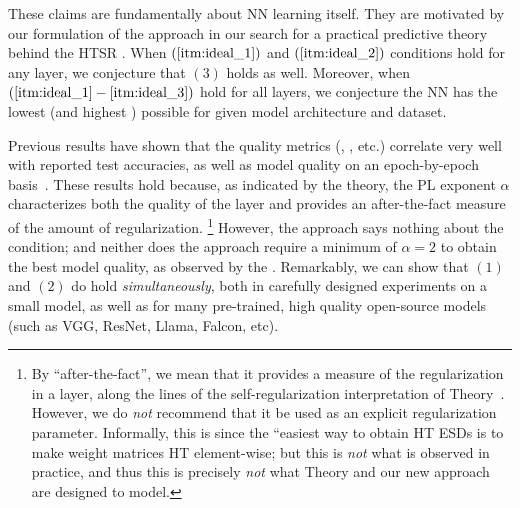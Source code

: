 These claims are fundamentally about NN learning itself. 
They are motivated by our formulation of the \SETOL approach in our search for a practical predictive theory behind the HTSR \Phenomenology.
When $(\ref{itm:ideal_1})$ and $(\ref{itm:ideal_2})$ conditions hold for any layer, we conjecture that $(3)$ holds as well.
Moreover, when $(\ref{itm:ideal_1}-\ref{itm:ideal_3})$ hold for all layers, we conjecture the
NN has the lowest \GeneralizationError (and highest \ModelQuality) possible for given model architecture and dataset.

Previous results have shown that the \HTSR quality metrics (\ALPHA,  \ALPHAHAT, etc.)  correlate very well with reported test accuracies,
as well as model quality on an epoch-by-epoch basis~\cite{MM18_TR_JMLRversion,KFWB13}.
These results hold because, as indicated by the \HTSR theory, the PL exponent $\alpha$ characterizes both the quality of the layer and provides an after-the-fact measure of the amount of regularization.%
\footnote{By ``after-the-fact'', we mean that it provides a measure of the regularization in a layer, along the lines of the self-regularization interpretation of \HTSR Theory~\cite{MM18_TR_JMLRversion}. However, we do \emph{not} recommend that it be used as an explicit regularization parameter. Informally, this is since the ``easiest way to obtain HT ESDs is to make weight matrices HT element-wise; but this is \emph{not} what is observed in practice, and thus this is precisely \emph{not} what \HTSR Theory and our new \SETOL approach are designed to model.}
However, the \HTSR approach says nothing about the \SETOL \TRACELOG condition; and neither does the \SETOL approach require a minimum of $\alpha=2$ to obtain the best model quality, as observed by the \HTSR \Phenomenology.
Remarkably, we can show that $(1)$ and $(2)$ do hold \emph{simultaneously}, both in carefully designed experiments on a small model,
as well as for many pre-trained, high quality open-source models (such as VGG, ResNet, Llama, Falcon, etc). 



